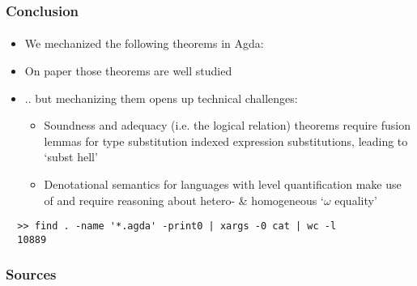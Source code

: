 \documentclass[dvipsnames,aspectratio=169,pdftex]{beamer}
\begin{document}
\begin{frame}[fragile]
  \frametitle{Conclusion}
  \framesubtitle{}
  \begin{itemize}
    \item We mechanized the following theorems in Agda: 
  \end{itemize}
  \begin{itemize} 
    \item On paper those theorems are well studied
    \item .. but mechanizing them opens up technical challenges:
    \begin{itemize} 
      \item Soundness and adequacy (i.e. the logical relation) theorems require fusion lemmas for type substitution indexed expression substitutions, leading to `subst hell'
      \item Denotational semantics for languages with level quantification make use of  and require reasoning about hetero- \& homogeneous `$\omega$ equality'
    \end{itemize}
  \end{itemize}
  \begin{verbatim} 
  >> find . -name '*.agda' -print0 | xargs -0 cat | wc -l
  10889
  \end{verbatim}
\end{frame}

\begin{frame}[fragile]
  \frametitle{Sources}  
   
  
\end{frame}
\end{document}
